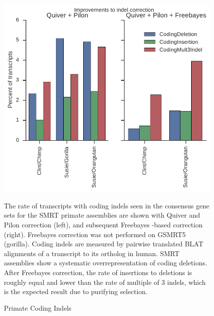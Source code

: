 \begin{figure}
\centering
\includegraphics[width=\textwidth,height=\textheight,keepaspectratio]{Supplemental_Figure_S3.pdf}
\caption{Primate Coding Indels}
The rate of transcripts with coding indels seen in the consensus gene sets for the SMRT primate assemblies are shown with Quiver and Pilon correction (left), and subsequent Freebayes  \citep{garrison2012haplotype}-based correction (right). Freebayes correction was not performed on GSMRT5 (gorilla). Coding indels are measured by pairwise translated BLAT alignments of a transcript to its ortholog in human. SMRT assemblies show a systematic overrepresentation of coding deletions. After Freebayes correction, the rate of insertions to deletions is roughly equal and lower than the rate of multiple of 3 indels, which is the expected result due to purifying selection.
\label{supp_fig:primate_indels}
\end{figure}

